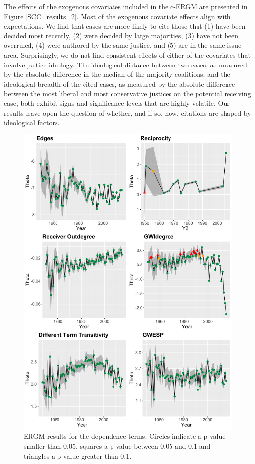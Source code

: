 \documentclass{cup-pan}
\begin{document}
The effects of the exogenous covariates included in the c-ERGM are presented in Figure \ref{SCC_results_2}.  Most of the exogenous covariate effects align with expectations. We find that cases are more likely to cite those that (1) have been decided most recently, (2) were decided by large majorities, (3) have not been overruled, (4) were authored by the same justice, and (5) are in the same issue area. Surprisingly, we do not find consistent effects of either of the covariates that involve justice ideology. The ideological distance between two cases, as measured by the absolute difference in the median of the majority coalitions; and the ideological breadth of the cited cases, as measured by the absolute difference between the most liberal and most conservative justices on the potential receiving case, both exhibit signs and significance levels that are highly volatile. Our results leave open the question of whether, and if so, how, citations are shaped by ideological factors.



\begin{figure}
\centering
\includegraphics[width=14cm ]{SCC_results_1.pdf}
\caption{ERGM results for the dependence terms. Circles indicate a p-value smaller than 0.05, squares a p-value between 0.05 and 0.1 and triangles a p-value greater than 0.1. }
 \label{SCC_results_1}
\end{figure}
\end{document}
